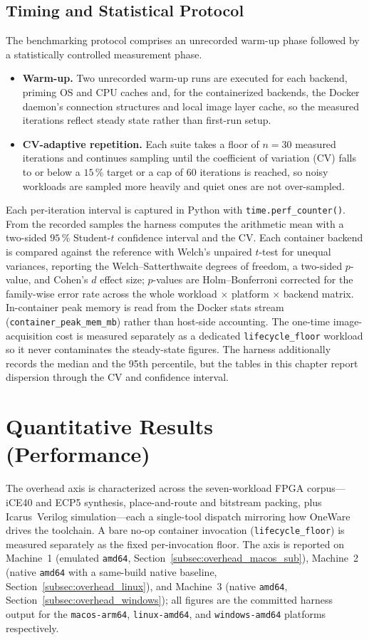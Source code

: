 \subsection{Timing and Statistical Protocol}
The benchmarking protocol comprises an unrecorded warm-up phase followed by a statistically controlled measurement phase.
\begin{itemize}
    \item \textbf{Warm-up.} Two unrecorded warm-up runs are executed for each backend, priming OS and CPU caches and, for the containerized backends, the Docker daemon's connection structures and local image layer cache, so the measured iterations reflect steady state rather than first-run setup.
    \item \textbf{CV-adaptive repetition.} Each suite takes a floor of $n = 30$ measured iterations and continues sampling until the coefficient of variation (CV) falls to or below a $15\,\%$ target or a cap of $60$ iterations is reached, so noisy workloads are sampled more heavily and quiet ones are not over-sampled.
\end{itemize}

Each per-iteration interval is captured in Python with \texttt{time.perf\_counter()}. From the recorded samples the harness computes the arithmetic mean with a two-sided $95\,\%$ Student-$t$ confidence interval and the CV. Each container backend is compared against the reference with Welch's unpaired $t$-test for unequal variances, reporting the Welch--Satterthwaite degrees of freedom, a two-sided $p$-value, and Cohen's $d$ effect size; $p$-values are Holm--Bonferroni corrected for the family-wise error rate across the whole workload $\times$ platform $\times$ backend matrix. In-container peak memory is read from the Docker stats stream (\texttt{container\_peak\_mem\_mb}) rather than host-side accounting. The one-time image-acquisition cost is measured separately as a dedicated \texttt{lifecycle\_floor} workload so it never contaminates the steady-state figures. The harness additionally records the median and the 95th percentile, but the tables in this chapter report dispersion through the CV and confidence interval.

\section{Quantitative Results (Performance)}

The overhead axis is characterized across the seven-workload FPGA corpus---iCE40 and ECP5 synthesis, place-and-route and bitstream packing, plus Icarus~Verilog simulation---each a single-tool dispatch mirroring how OneWare drives the toolchain. A bare no-op container invocation (\texttt{lifecycle\_floor}) is measured separately as the fixed per-invocation floor. The axis is reported on Machine~1 (emulated \texttt{amd64}, Section~\ref{subsec:overhead_macos_sub}), Machine~2 (native \texttt{amd64} with a same-build native baseline, Section~\ref{subsec:overhead_linux}), and Machine~3 (native \texttt{amd64}, Section~\ref{subsec:overhead_windows}); all figures are the committed harness output for the \texttt{macos-arm64}, \texttt{linux-amd64}, and \texttt{windows-amd64} platforms respectively.

